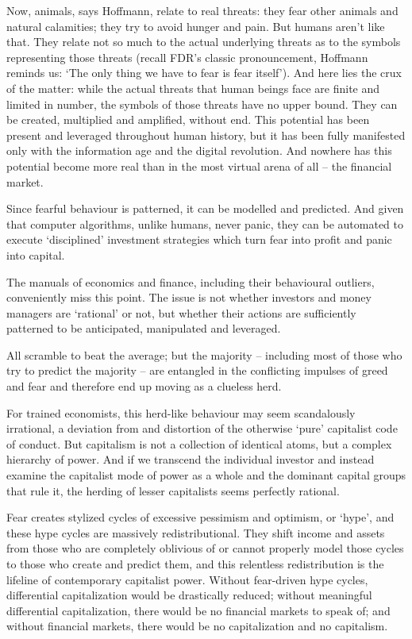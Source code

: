 \documentclass[
]{book}
\begin{document}
Now, animals, says Hoffmann, relate to real threats: they fear other animals and natural
calamities; they try to avoid hunger and pain. But humans aren't like that. They relate not so
much to the actual underlying threats as to the symbols representing those threats (recall
FDR's classic pronouncement, Hoffmann reminds us: `The only thing we have to fear is fear
itself'). And here lies the crux of the matter: while the actual threats that human beings face
are finite and limited in number, the symbols of those threats have no upper bound. They can
be created, multiplied and amplified, without end. This potential has been present and
leveraged throughout human history, but it has been fully manifested only with the information
age and the digital revolution. And nowhere has this potential become more real than in the
most virtual arena of all -- the financial market.

Since fearful behaviour is
patterned, it can be modelled and predicted. And given that computer algorithms, unlike
humans, never panic, they can be automated to execute `disciplined' investment strategies
which turn fear into profit and panic into capital.

The manuals of economics and finance, including their behavioural outliers, conveniently miss
this point. The issue is not whether investors and money managers are `rational' or not, but
whether their actions are sufficiently patterned to be anticipated, manipulated and leveraged.

All scramble to beat the
average; but the majority -- including most of those who try to predict the majority -- are
entangled in the conflicting impulses of greed and fear and therefore end up moving as a
clueless herd.

For trained economists, this herd-like behaviour may seem scandalously
irrational, a deviation from and distortion of the otherwise `pure' capitalist code of conduct. But
capitalism is not a collection of identical atoms, but a complex hierarchy of power. And if we
transcend the individual investor and instead examine the capitalist mode of power as a
whole and the dominant capital groups that rule it, the herding of lesser capitalists seems
perfectly rational.

Fear creates stylized cycles of excessive pessimism and optimism, or `hype', and these hype
cycles are massively redistributional. They shift income and assets from those who are
completely oblivious of or cannot properly model those cycles to those who create and predict
them, and this relentless redistribution is the lifeline of contemporary capitalist power. Without
fear-driven hype cycles, differential capitalization would be drastically reduced; without
meaningful differential capitalization, there would be no financial markets to speak of; and
without financial markets, there would be no capitalization and no capitalism.
\end{document}
